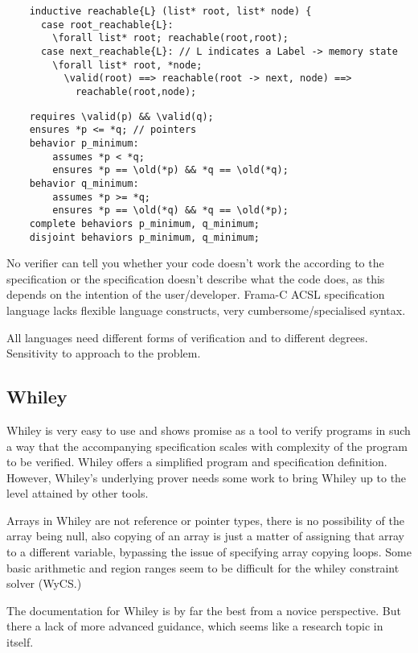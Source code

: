 \documentclass[10pt]{article} %
\begin{document}
\begin{lstlisting}
	inductive reachable{L} (list* root, list* node) {
	  case root_reachable{L}:
	    \forall list* root; reachable(root,root);
	  case next_reachable{L}: // L indicates a Label -> memory state
	    \forall list* root, *node;
	      \valid(root) ==> reachable(root -> next, node) ==>
	        reachable(root,node);
\end{lstlisting}
\begin{lstlisting}
	requires \valid(p) && \valid(q);
	ensures *p <= *q; // pointers
	behavior p_minimum:
		assumes *p < *q;
		ensures *p == \old(*p) && *q == \old(*q);
	behavior q_minimum:
		assumes *p >= *q;
		ensures *p == \old(*q) && *q == \old(*p);
	complete behaviors p_minimum, q_minimum;
	disjoint behaviors p_minimum, q_minimum;
\end{lstlisting}

No verifier can tell you whether your code doesn't work the according to the specification or the specification doesn't describe what the code does, as this depends on the intention of the user\slash developer.
Frama-C ACSL specification language lacks flexible language constructs, very cumbersome\slash specialised syntax.

All languages need different forms of verification and to different degrees. Sensitivity to approach to the problem.
\subsection{Whiley}
	Whiley is very easy to use and shows promise as a tool to verify programs in such a way that the accompanying specification scales with complexity of the program to be verified. Whiley offers a simplified program and specification definition. However, Whiley's underlying prover needs some work to bring Whiley up to the level attained by other tools.

Arrays in Whiley are not reference or pointer types, there is no possibility of the array being null, also copying of an array is just a matter of assigning that array to a different variable, bypassing the issue of specifying array copying loops. Some basic arithmetic and region ranges seem to be difficult for the whiley constraint solver (WyCS.)

The documentation for Whiley is by far the best from a novice perspective. But there a lack of more advanced guidance, which seems like a research topic in itself.
\end{document}
